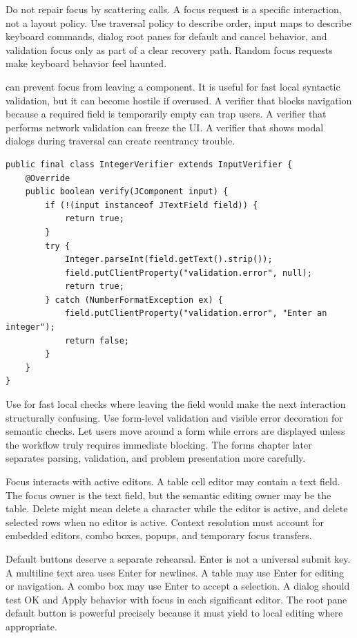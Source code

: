 Do not repair focus by scattering  calls. A focus request is a specific interaction, not a layout policy. Use traversal policy to describe order, input maps to describe keyboard commands, dialog root panes for default and cancel behavior, and validation focus only as part of a clear recovery path. Random focus requests make keyboard behavior feel haunted.

 can prevent focus from leaving a component. It is useful for fast local syntactic validation, but it can become hostile if overused. A verifier that blocks navigation because a required field is temporarily empty can trap users. A verifier that performs network validation can freeze the UI. A verifier that shows modal dialogs during traversal can create reentrancy trouble.

\begin{lstlisting}[caption={A local verifier that avoids expensive work.}]
public final class IntegerVerifier extends InputVerifier {
    @Override
    public boolean verify(JComponent input) {
        if (!(input instanceof JTextField field)) {
            return true;
        }
        try {
            Integer.parseInt(field.getText().strip());
            field.putClientProperty("validation.error", null);
            return true;
        } catch (NumberFormatException ex) {
            field.putClientProperty("validation.error", "Enter an integer");
            return false;
        }
    }
}
\end{lstlisting}

Use  for fast local checks where leaving the field would make the next interaction structurally confusing. Use form-level validation and visible error decoration for semantic checks. Let users move around a form while errors are displayed unless the workflow truly requires immediate blocking. The forms chapter later separates parsing, validation, and problem presentation more carefully.

Focus interacts with active editors. A table cell editor may contain a text field. The focus owner is the text field, but the semantic editing owner may be the table. Delete might mean delete a character while the editor is active, and delete selected rows when no editor is active. Context resolution must account for embedded editors, combo boxes, popups, and temporary focus transfers.

Default buttons deserve a separate rehearsal. Enter is not a universal submit key. A multiline text area uses Enter for newlines. A table may use Enter for editing or navigation. A combo box may use Enter to accept a selection. A dialog should test OK and Apply behavior with focus in each significant editor. The root pane default button is powerful precisely because it must yield to local editing where appropriate.

